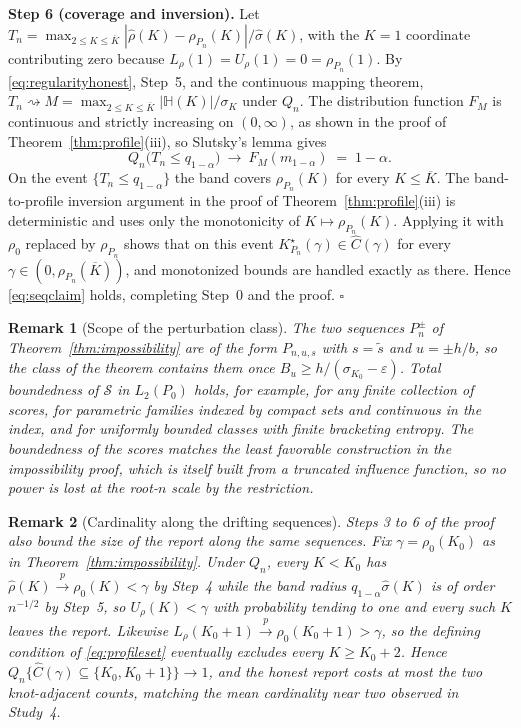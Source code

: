 \documentclass[11pt]{article}
\newtheorem{remark}{Remark}
\newcommand{\dto}{\rightsquigarrow}
\newcommand{\pto}{\overset{p}{\to}}
\newcommand{\calS}{\mathcal S}
\newcommand{\eps}{\varepsilon}
\begin{document}
\textbf{Step 6 (coverage and inversion).} Let $T_n=\max_{2\le K\le\overline K}|\hat\rho(K)-\rho_{P_n}(K)|/\hat\sigma(K)$, with the $K=1$ coordinate contributing zero because $L_\rho(1)=U_\rho(1)=0=\rho_{P_n}(1)$. By \eqref{eq:regularityhonest}, Step~5, and the continuous mapping theorem, $T_n\dto M=\max_{2\le K\le\overline K}|\mathbb H(K)|/\sigma_K$ under $Q_n$. The distribution function $F_M$ is continuous and strictly increasing on $(0,\infty)$, as shown in the proof of Theorem~\ref{thm:profile}(iii), so Slutsky's lemma gives
\begin{equation*}
Q_n\bigl(T_n\le q_{1-\alpha}\bigr)\ \longrightarrow\ F_M(m_{1-\alpha})\;=\;1-\alpha .
\end{equation*}
On the event $\{T_n\le q_{1-\alpha}\}$ the band covers $\rho_{P_n}(K)$ for every $K\le\overline K$. The band-to-profile inversion argument in the proof of Theorem~\ref{thm:profile}(iii) is deterministic and uses only the monotonicity of $K\mapsto\rho_{P_n}(K)$. Applying it with $\rho_0$ replaced by $\rho_{P_n}$ shows that on this event $K^\star_{P_n}(\gamma)\in\widehat C(\gamma)$ for every $\gamma\in(0,\rho_{P_n}(\overline K))$, and monotonized bounds are handled exactly as there. Hence \eqref{eq:seqclaim} holds, completing Step~0 and the proof. \hfill$\square$

\begin{remark}[Scope of the perturbation class]\label{rem:honestscope}
The two sequences $P_n^{\pm}$ of Theorem~\ref{thm:impossibility} are of the form $P_{n,u,s}$ with $s=\tilde s$ and $u=\pm h/b$, so the class of the theorem contains them once $B_u\ge h/(\sigma_{K_0}-\eps)$. Total boundedness of $\calS$ in $L_2(P_0)$ holds, for example, for any finite collection of scores, for parametric families indexed by compact sets and continuous in the index, and for uniformly bounded classes with finite bracketing entropy. The boundedness of the scores matches the least favorable construction in the impossibility proof, which is itself built from a truncated influence function, so no power is lost at the root-$n$ scale by the restriction.
\end{remark}

\begin{remark}[Cardinality along the drifting sequences]\label{rem:cardinality}
Steps 3 to 6 of the proof also bound the size of the report along the same sequences. Fix $\gamma=\rho_0(K_0)$ as in Theorem~\ref{thm:impossibility}. Under $Q_n$, every $K<K_0$ has $\hat\rho(K)\pto\rho_0(K)<\gamma$ by Step~4 while the band radius $q_{1-\alpha}\hat\sigma(K)$ is of order $n^{-1/2}$ by Step~5, so $U_\rho(K)<\gamma$ with probability tending to one and every such $K$ leaves the report. Likewise $L_\rho(K_0+1)\pto\rho_0(K_0+1)>\gamma$, so the defining condition of \eqref{eq:profileset} eventually excludes every $K\ge K_0+2$. Hence $Q_n\{\widehat C(\gamma)\subseteq\{K_0,K_0+1\}\}\to1$, and the honest report costs at most the two knot-adjacent counts, matching the mean cardinality near two observed in Study~4.
\end{remark}
\end{document}
